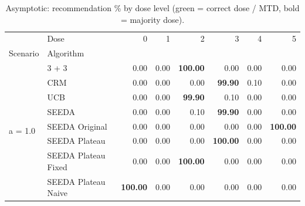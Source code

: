 \begin{table}[H]
\centering
\caption{Asymptotic: recommendation \% by dose level (green = correct dose / MTD, bold = majority dose).}
\label{tab:asym_rec_by_dose}
\begin{tabular}{llrrrrrr}
\toprule
 & Dose & 0 & 1 & 2 & 3 & 4 & 5 \\
Scenario & Algorithm &  &  &  &  &  &  \\
\midrule
\multirow[c]{8}{*}{a = 1.0} & 3 + 3 & 0.00 & 0.00 & {\cellcolor[HTML]{C8E6C9}} \bfseries 100.00 & 0.00 & 0.00 & 0.00 \\
 & CRM & 0.00 & 0.00 & {\cellcolor[HTML]{C8E6C9}} 0.00 & \bfseries 99.90 & 0.10 & 0.00 \\
 & UCB & 0.00 & 0.00 & {\cellcolor[HTML]{C8E6C9}} \bfseries 99.90 & 0.10 & 0.00 & 0.00 \\
 & SEEDA & 0.00 & 0.00 & {\cellcolor[HTML]{C8E6C9}} 0.10 & \bfseries 99.90 & 0.00 & 0.00 \\
 & SEEDA Original & 0.00 & 0.00 & {\cellcolor[HTML]{C8E6C9}} 0.00 & 0.00 & 0.00 & \bfseries 100.00 \\
 & SEEDA Plateau & 0.00 & 0.00 & {\cellcolor[HTML]{C8E6C9}} 0.00 & \bfseries 100.00 & 0.00 & 0.00 \\
 & SEEDA Plateau Fixed & 0.00 & 0.00 & {\cellcolor[HTML]{C8E6C9}} \bfseries 100.00 & 0.00 & 0.00 & 0.00 \\
 & SEEDA Plateau Naive & \bfseries 100.00 & 0.00 & {\cellcolor[HTML]{C8E6C9}} 0.00 & 0.00 & 0.00 & 0.00 \\
\bottomrule
\end{tabular}
\end{table}
